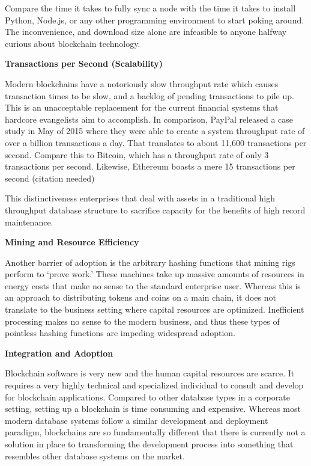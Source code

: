 \documentclass{%
	article}
\begin{document}
Compare the time it takes to fully sync a node with the time it takes to install Python, Node.js, or any other programming environment to start poking around. The inconvenience, and download size alone are infeasible to anyone halfway curious about blockchain technology.

\begin{center}
\textbf{Transactions per Second (Scalability)}
\end{center}

Modern blockchains have a notoriously slow throughput rate which causes transaction times to be slow, and a backlog of pending transactions to pile up. This is an unacceptable replacement for the current financial systems that hardcore evangelists aim to accomplish. In comparison, PayPal released a case study in May of 2015 where they were able to create a system throughput rate of over a billion transactions a day. That translates to about 11,600 transactions per second. Compare this to Bitcoin, which has a throughput rate of only 3 transactions per second. Likewise, Ethereum boasts a mere 15 transactions per second (citation needed)

This distinctiveness enterprises that deal with assets in a traditional high throughput database structure to sacrifice capacity for the benefits of high record maintenance.

\begin{center}
\textbf{Mining and Resource Efficiency}
\end{center}

Another barrier of adoption is the arbitrary hashing functions that mining rigs perform to ‘prove work.’ These machines take up massive amounts of resources in energy costs that make no sense to the standard enterprise user. Whereas this is an approach to distributing tokens and coins on a main chain, it does not translate to the business setting where capital resources are optimized. Inefficient processing makes no sense to the modern business, and thus these types of pointless hashing functions are impeding widespread adoption.

\begin{center}
\textbf{Integration and Adoption}
\end{center}
Blockchain software is very new and the human capital resources are scarce. It requires a very highly technical and specialized individual to consult and develop for blockchain applications. Compared to other database types in a corporate setting, setting up a blockchain is time consuming and expensive. Whereas most modern database systems follow a similar development and deployment paradigm, blockchains are so fundamentally different that there is currently not a solution in place to transforming the development process into something that resembles other database systems on the market.
\end{document}
